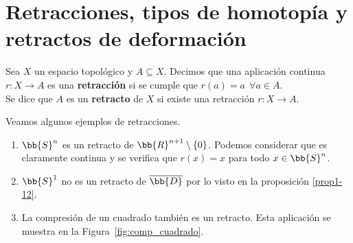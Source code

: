 \section{Retracciones, tipos de homotopía y retractos de deformación}\label{sec:retractos_deformacion}

\begin{definicion}
    Sea $X$ un espacio topológico y $A\subseteq X$. Decimos que una aplicación continua $r:X \to A$ es una \textbf{retracción} si se cumple que $r(a) = a\ \ \forall a \in A$.\\

    Se dice que $A$ es un \textbf{retracto} de $X$ si existe una retracción $r:X \to A$.
\end{definicion}

\begin{ejemplo}Veamos algunos ejemplos de retracciones.\label{ejemplo:retracto}
    \begin{enumerate}
        \item \label{item:retracto_sn}
        $\bb{S}^n$ es un retracto de $\bb{R}^{n+1}\setminus \{0\}$. Podemos considerar
        que es claramente continua y se verifica que $r(x) = x$ para todo $x\in \bb{S}^n$.

        \item $\bb{S}^1$ no es un retracto de $\overline{\bb{D}}$ por lo visto en la proposición \ref{prop1-12}.
        
        \item
        \label{item:retracto_cuadrado}
        La compresión de un cuadrado también es un retracto. Esta aplicación se muestra en la Figura~\ref{fig:comp_cuadrado}.
        \begin{figure}[ht]
            \centering
\end{figure}
\end{enumerate}
\end{ejemplo}
